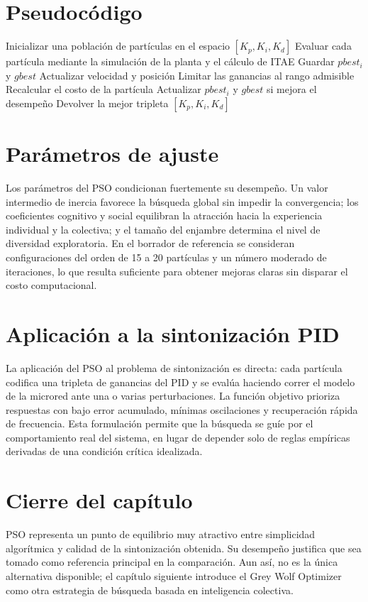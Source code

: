 \section{Pseudocódigo}
\begin{algorithm}[H]
\caption{Esquema general del PSO para sintonización PID}
\begin{algorithmic}[1]
\State Inicializar una población de partículas en el espacio $\left[K_p,K_i,K_d\right]$
\State Evaluar cada partícula mediante la simulación de la planta y el cálculo de ITAE
\State Guardar $pbest_i$ y $gbest$
        \State Actualizar velocidad y posición
        \State Limitar las ganancias al rango admisible
        \State Recalcular el costo de la partícula
        \State Actualizar $pbest_i$ y $gbest$ si mejora el desempeño
    \EndFor
\EndWhile
\State Devolver la mejor tripleta $\left[K_p,K_i,K_d\right]$
\end{algorithmic}
\end{algorithm}

\section{Parámetros de ajuste}
Los parámetros del PSO condicionan fuertemente su desempeño. Un valor intermedio de inercia
favorece la búsqueda global sin impedir la convergencia; los coeficientes cognitivo y social
equilibran la atracción hacia la experiencia individual y la colectiva; y el tamaño del enjambre
determina el nivel de diversidad exploratoria. En el borrador de referencia se consideran
configuraciones del orden de 15 a 20 partículas y un número moderado de iteraciones, lo que
resulta suficiente para obtener mejoras claras sin disparar el costo computacional.

\section{Aplicación a la sintonización PID}
La aplicación del PSO al problema de sintonización es directa: cada partícula codifica una
tripleta de ganancias del PID y se evalúa haciendo correr el modelo de la microred ante una o
varias perturbaciones. La función objetivo prioriza respuestas con bajo error acumulado,
mínimas oscilaciones y recuperación rápida de frecuencia. Esta formulación permite que la
búsqueda se guíe por el comportamiento real del sistema, en lugar de depender solo de reglas
empíricas derivadas de una condición crítica idealizada.

\section{Cierre del capítulo}
PSO representa un punto de equilibrio muy atractivo entre simplicidad algorítmica y calidad de
la sintonización obtenida. Su desempeño justifica que sea tomado como referencia principal en
la comparación. Aun así, no es la única alternativa disponible; el capítulo siguiente introduce
el Grey Wolf Optimizer como otra estrategia de búsqueda basada en inteligencia colectiva.
